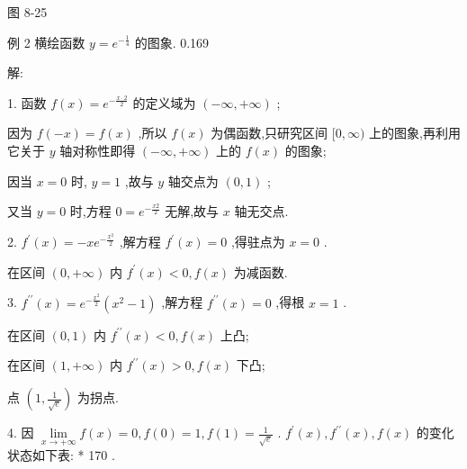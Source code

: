 \documentclass[lang=cn,newtx,10pt,scheme=chinese]{elegantbook}
\begin{document}
图 8-25

例 2 横绘函数 \(y = {e}^{-\frac{1}{4}}\) 的图象. 0.169

解:

1. 函数 \(f\left( x\right) = {e}^{-\frac{x \cdot 2}{2}}\) 的定义域为 \(\left( {-\infty , + \infty }\right)\) ;

因为 \(f\left( {-x}\right) = f\left( x\right)\) ,所以 \(f\left( x\right)\) 为偶函数,只研究区间 \(\lbrack 0,\infty )\) 上的图象,再利用它关于 \(y\) 轴对称性即得 \(\left( {-\infty , + \infty }\right)\) 上的 \(f\left( x\right)\) 的图象;

因当 \(x = 0\) 时, \(y = 1\) ,故与 \(y\) 轴交点为 \(\left( {0,1}\right)\) ;

又当 \(y = 0\) 时,方程 \(0 = {e}^{-\frac{x2}{2}}\) 无解,故与 \(x\) 轴无交点.

2. \({f}^{\prime }\left( x\right) = - x{e}^{-\frac{{x}^{2}}{2}}\) ,解方程 \({f}^{\prime }\left( x\right) = 0\) ,得驻点为 \(x = 0\) .

在区间 \(\left( {0, + \infty }\right)\) 内 \({f}^{\prime }\left( x\right) < 0,f\left( x\right)\) 为减函数.

3. \({f}^{\prime \prime }\left( x\right) = {e}^{-\frac{{x}^{2}}{2}}\left( {{x}^{2} - 1}\right)\) ,解方程 \({f}^{\prime \prime }\left( x\right) = 0\) ,得根 \(x = 1\) .

在区间 \(\left( {0,1}\right)\) 内 \({f}^{\prime \prime }\left( x\right) < 0,f\left( x\right)\) 上凸;

在区间 \(\left( {1, + \infty }\right)\) 内 \({f}^{\prime \prime }\left( x\right) > 0,f\left( x\right)\) 下凸;

点 \(\left( {1,\frac{1}{\sqrt{e}}}\right)\) 为拐点.

4. 因 \(\mathop{\lim }\limits_{{x \rightarrow + \infty }}f\left( x\right) = 0,f\left( 0\right) = 1,f\left( 1\right) = \frac{1}{\sqrt{e}}\) . \({f}^{\prime }\left( x\right) ,{f}^{\prime \prime }\left( x\right) ,f\left( x\right)\) 的变化状态如下表: * 170 .

\begin{center}
\end{center}
\end{document}
